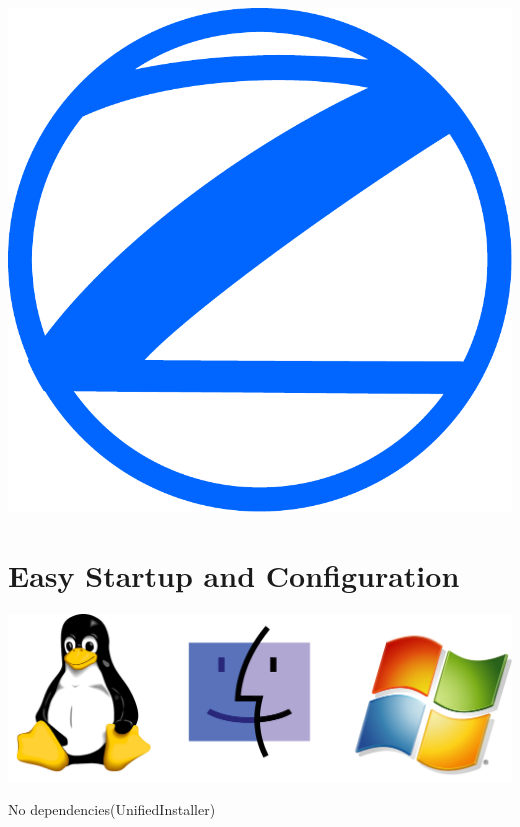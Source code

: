 \documentclass[arial,pdftex]{beamer}
\begin{document}
\begin{frame}
  \begin{center}
    \includegraphics[height=0.5\textheight]{zope.pdf}
  \end{center}
\end{frame}

\section{Easy Startup and Configuration}
\begin{frame}
  \includegraphics[width=\textwidth]{platforms.pdf} \pause
  \begin{center}
    No dependencies(UnifiedInstaller)
  \end{center}
\end{frame}
\end{document}
